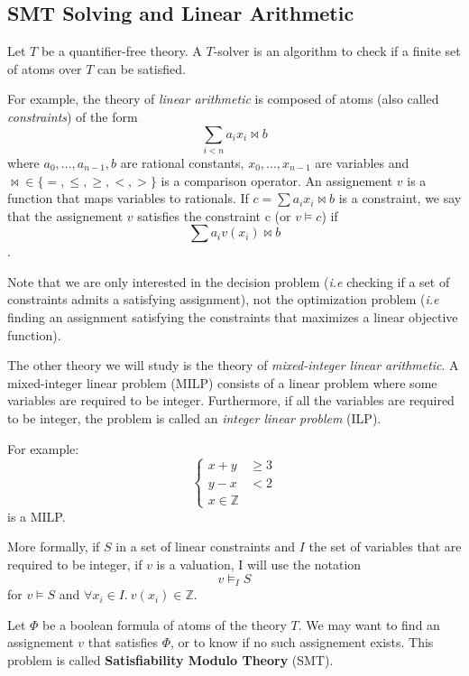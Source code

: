 \documentclass{article}
\newcommand{\ints}{\mathbb{Z}}
\begin{document}
\subsection{SMT Solving and Linear Arithmetic}
\label{smt}
Let $T$ be a quantifier-free theory. A $T$-solver is an algorithm to check if a
finite set of atoms over $T$ can be satisfied.

For example, the theory of \textit{linear arithmetic} is composed of atoms (also
called \textit{constraints}) of the form
$$\sum_{i < n} a_i x_i \bowtie b$$
where $a_0, ..., a_{n-1}, b$ are rational constants, $x_0, ..., x_{n-1}$ are
variables and ${\bowtie} \in \{=,\leqslant,\geqslant,<,>\}$ is a comparison
operator. An assignement $v$ is a function that maps variables to rationals.
If $c = \sum a_i x_i \bowtie b$ is a constraint,  we say that the assignement
$v$ satisfies the constraint c (or $v \vDash c$) if
$$\sum a_i v(x_i) \bowtie b$$.

Note that we are only interested in the decision problem (\textit{i.e} checking
if a set of constraints admits a satisfying assignment), not the optimization
problem (\textit{i.e} finding an assignment satisfying the constraints that
maximizes a linear objective function). 

The other theory we will study is the theory of \textit{mixed-integer linear
arithmetic}. A mixed-integer linear problem (MILP)
consists of a linear problem where some variables are
required to be integer. Furthermore, if all the variables are required to be
integer, the problem is called an \textit{integer linear problem} (ILP).

For example:
\begin{displaymath}
  \left\{
  \begin{array}{cc}
    x + y & \geqslant 3 \\
    y - x & < 2 \\
    x \in \ints
  \end{array}
  \right.
\end{displaymath}
is a MILP.

More formally, if $S$ in a set of linear constraints and $I$ the set of
variables that are required to be integer, if $v$ is a valuation, I will use the
notation $$v \vDash_I S$$ for $v \vDash S$ and
$\forall x_i \in I.~v(x_i) \in \ints$.

Let $\Phi$ be a boolean formula of atoms of the theory $T$. We may want to find
an assignement $v$ that satisfies $\Phi$, or to know if no such assignement
exists. This problem is called \textbf{Satisfiability Modulo Theory} (SMT).
\end{document}
